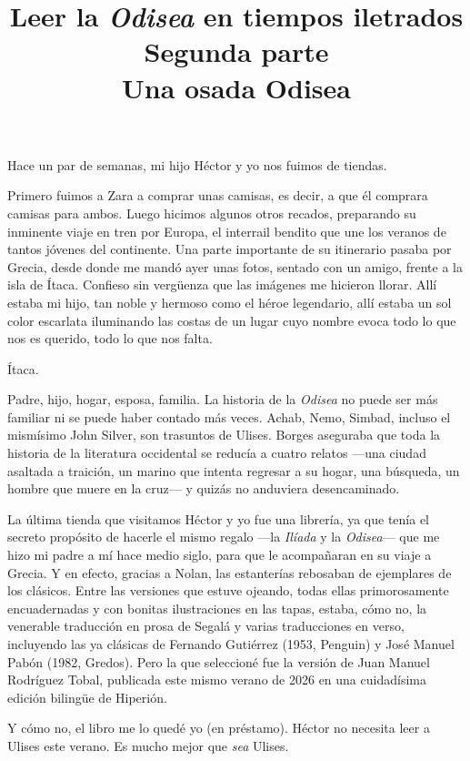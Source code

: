 \documentclass[11pt,a4paper]{article}
\title{Leer la \emph{Odisea} en tiempos iletrados \\ Segunda parte \\ Una osada Odisea}
\author{}
\date{}
\begin{document}
\maketitle

Hace un par de semanas, mi hijo Héctor y yo nos fuimos de tiendas.

Primero fuimos a Zara a comprar unas camisas, es decir, a que él comprara camisas para ambos. Luego hicimos algunos otros recados, preparando su inminente viaje en tren por Europa, el interrail bendito que une los veranos de tantos jóvenes del continente. Una parte importante de su itinerario pasaba por Grecia, desde donde me mandó ayer unas fotos, sentado con un amigo, frente a la isla de Ítaca. Confieso sin vergüenza que las imágenes me hicieron llorar. Allí estaba mi hijo, tan noble y hermoso como el héroe legendario, allí estaba un sol color escarlata iluminando las costas de un lugar cuyo nombre evoca todo lo que nos es querido, todo lo que nos falta.

Ítaca.

Padre, hijo, hogar, esposa, familia. La historia de la \emph{Odisea} no puede ser más familiar ni se puede haber contado más veces. Achab, Nemo, Simbad, incluso el mismísimo John Silver, son trasuntos de Ulises. Borges aseguraba que toda la historia de la literatura occidental se reducía a cuatro relatos ---una ciudad asaltada a traición, un marino que intenta regresar a su hogar, una búsqueda, un hombre que muere en la cruz--- y quizás no anduviera desencaminado.

La última tienda que visitamos Héctor y yo fue una librería, ya que tenía el secreto propósito de hacerle el mismo regalo ---la \emph{Ilíada} y la \emph{Odisea}--- que me hizo mi padre a mí hace medio siglo, para que le acompañaran en su viaje a Grecia. Y en efecto, gracias a Nolan, las estanterías rebosaban de ejemplares de los clásicos. Entre las versiones que estuve ojeando, todas ellas primorosamente encuadernadas y con bonitas ilustraciones en las tapas, estaba, cómo no, la venerable traducción en prosa de Segalá y varias traducciones en verso, incluyendo las ya clásicas de Fernando Gutiérrez (1953, Penguin) y José Manuel Pabón (1982, Gredos). Pero la que seleccioné fue la versión de Juan Manuel Rodríguez Tobal, publicada este mismo verano de 2026 en una cuidadísima edición bilingüe de Hiperión. 

Y cómo no, el libro me lo quedé yo (en préstamo). Héctor no necesita leer a Ulises este verano. Es mucho mejor que \emph{sea} Ulises.
\end{document}
